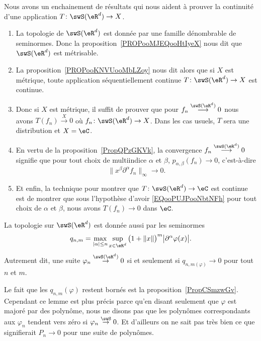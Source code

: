 \begin{normaltext}      \label{NORMooVQESooRwJShl}
	Nous avons un enchainement de résultats qui nous aident à prouver la continuité d'une application \( T\colon \swS(\eR^d)\to X\).
	\begin{enumerate}
		\item
		      La topologie de \( \swS(\eR^d)\) est donnée par une famille dénombrable de seminormes. Donc la proposition~\ref{PROPooMJEQooHtIyeX} nous dit que \( \swS(\eR^d)\) est métrisable.
		\item
		      La proposition~\ref{PROPooKNVUooMbLZoy} nous dit alors que si \( X\) est métrique, toute application séquentiellement continue \( T\colon \swS(\eR^d)\to X\) est continue.
		\item
		      Donc si \( X\) est métrique, il suffit de prouver que pour \( f_n\stackrel{\swS(\eR^d)}{\longrightarrow}0\) nous avons \( T(f_n)\stackrel{X}{\longrightarrow} 0\) où \( f_n\colon \swS(\eR^d)\to X\). Dans les cas usuels, \( T\) sera une distribution et \( X=\eC\).
		\item
		      En vertu de la proposition~\ref{PropQPzGKVk}, la convergence \( f_n\stackrel{\swS(\eR^d)}{\longrightarrow}0\) signifie que pour tout choix de multiindice \( \alpha\) et \( \beta\),  \( p_{\alpha,\beta}(f_n)\to 0\), c'est-à-dire
		      \begin{equation}        \label{EQooPUJPooNbtNFh}
			      \| x^{\beta}\partial^{\alpha}f_n \|_{\infty}\to 0.
		      \end{equation}
		\item
		      Et enfin, la technique pour montrer que \( T\colon \swS(\eR^d)\to \eC\) est continue est de montrer que sous l'hypothèse d'avoir \eqref{EQooPUJPooNbtNFh} pour tout choix de \( \alpha\) et \( \beta\), nous avons \( T(f_n)\to 0\) dans \( \eC\).
	\end{enumerate}
\end{normaltext}

\begin{lemma}   \label{LemRJhCbkO}
	La topologie sur \( \swS(\eR^d)\) est donnée aussi par les seminormes
	\begin{equation}
		q_{n,m}=\max_{| \alpha |\leq n}\sup_{x\in \eR^d}\big( 1+\| x \| \big)^m\big| \partial^{\alpha}\varphi(x) \big|.
	\end{equation}
	Autrement dit, une suite \( \varphi_n\stackrel{\swS(\eR^d)}{\to}0\) si et seulement si \( q_{n,m(\varphi)}\to 0\) pour tout \( n\) et \( m\).
\end{lemma}
Le fait que les \( q_{n,m}(\varphi)\) restent bornés est la proposition~\ref{PropCSmzwGv}. Cependant ce lemme est plus précis parce qu'en disant seulement que \( \varphi\) est majoré par des polynôme, nous ne disons pas que les polynômes correspondants aux \( \varphi_n\) tendent vers zéro si \( \varphi_n\stackrel{\swS}{\to}0\). Et d'ailleurs on ne sait pas très bien ce que signifierait \( P_n\to 0\) pour une suite de polynômes.

